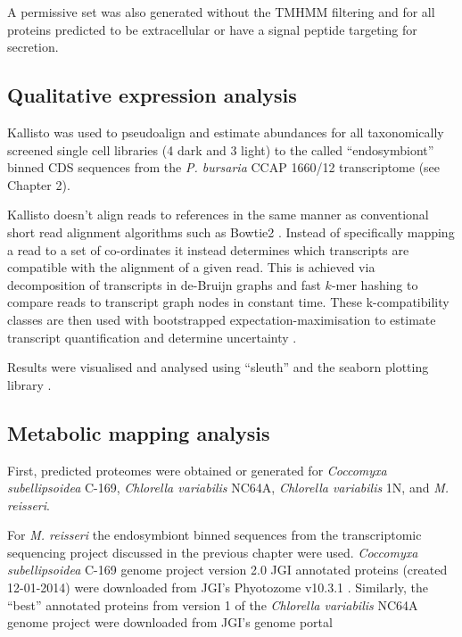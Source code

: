 A permissive set was also generated without the TMHMM filtering 
and for all proteins predicted to be extracellular or have a signal
peptide targeting for secretion.

\subsection{Qualitative expression analysis}

Kallisto \citep{Bray2015} was used to pseudoalign and estimate abundances for 
all taxonomically screened single cell 
libraries (4 dark and 3 light) to the called ``endosymbiont''
binned CDS sequences from the \textit{P. bursaria} CCAP 1660/12
transcriptome (see Chapter 2).

Kallisto doesn't align reads to references in the same
manner as conventional short read alignment algorithms
such as Bowtie2 \citep{Langmead2012}.  Instead of specifically 
mapping a read to a set of co-ordinates it instead
determines which transcripts are compatible with the alignment 
of a given read.  This is achieved via decomposition of transcripts
in de-Bruijn graphs and fast \(k\)-mer hashing to compare reads to transcript
graph nodes in constant time.  These k-compatibility classes are then used with
bootstrapped expectation-maximisation to estimate transcript quantification and
determine uncertainty \citep{Bray2015}. 

Results were visualised and analysed using ``sleuth'' and the
seaborn plotting library \citep{michael_waskom_2015_19108}.

\subsection{Metabolic mapping analysis}

First, predicted proteomes were obtained or generated for
\textit{Coccomyxa subellipsoidea} C-169, \textit{Chlorella variabilis}
NC64A, \textit{Chlorella variabilis} 1N, and \textit{M. reisseri}. 

For \textit{M. reisseri} the endosymbiont binned sequences from the transcriptomic
sequencing project discussed in the previous chapter were used. 
\textit{Coccomyxa subellipsoidea} C-169 genome project \citep{Blanc2012} version 2.0 
JGI annotated proteins (created 12-01-2014) were downloaded from JGI's
Phyotozome v10.3.1 \citep{Goodstein2012}. 
Similarly, the ``best'' annotated proteins from
version 1 of the \textit{Chlorella variabilis} NC64A genome project \citep{Blanc2010}
were downloaded from JGI's genome portal \citep{Grigoriev2011,Nordberg2014}

